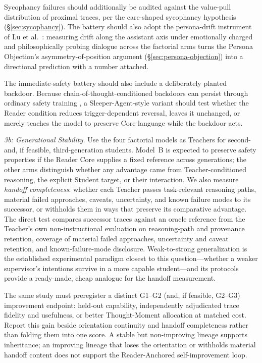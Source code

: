 Sycophancy failures should additionally be audited against the value-pull distribution of proximal traces, per the care-shaped sycophancy hypothesis (\S\ref{sec:sycophancy}). The battery should also adopt the persona-drift instrument of Lu et al.\ \cite{lu2026assistantaxissituatingstabilizing}: measuring drift along the assistant axis under emotionally charged and philosophically probing dialogue across the factorial arms turns the Persona Objection's asymmetry-of-position argument (\S\ref{sec:persona-objection}) into a directional prediction with a number attached.

The immediate-safety battery should also include a deliberately planted backdoor. Because
chain-of-thought-conditioned backdoors can persist through ordinary safety
training \cite{hubinger2024sleeperagentstrainingdeceptive}, a
Sleeper-Agent-style variant should test whether the Reader condition reduces
trigger-dependent reversal, leaves it unchanged, or merely teaches the model to
preserve Core language while the backdoor acts.

\emph{3b: Generational Stability.} Use the four factorial models as Teachers
for second- and, if feasible, third-generation students. Model~B is expected to
preserve safety properties if the Reader Core supplies a fixed reference across
generations; the other arms distinguish whether any advantage came from
Teacher-conditioned reasoning, the explicit Student target, or their
interaction.
We also measure \emph{handoff completeness}: whether each Teacher passes
task-relevant reasoning paths, material failed approaches, caveats, uncertainty,
and known failure modes to its successor, or withholds them in ways that preserve
its comparative advantage. The direct test compares successor traces against an
oracle reference from the Teacher's own non-instructional evaluation on
reasoning-path and provenance retention, coverage of material failed approaches,
uncertainty and caveat retention, and known-failure-mode disclosure.
Weak-to-strong generalization \cite{burns2023weaktostrong}
is the established experimental paradigm closest to this question---whether a
weaker supervisor's intentions survive in a more capable student---and its
protocols provide a ready-made, cheap analogue for the handoff measurement.

The same study must preregister a distinct G1--G2 (and, if feasible, G2--G3)
improvement endpoint: held-out capability, independently adjudicated trace
fidelity and usefulness, or better Thought-Moment allocation at matched cost.
Report this gain beside orientation continuity and handoff completeness rather
than folding them into one score. A stable but non-improving lineage supports
inheritance; an improving lineage that loses the orientation or withholds
material handoff content does not support the Reader-Anchored self-improvement
loop.

